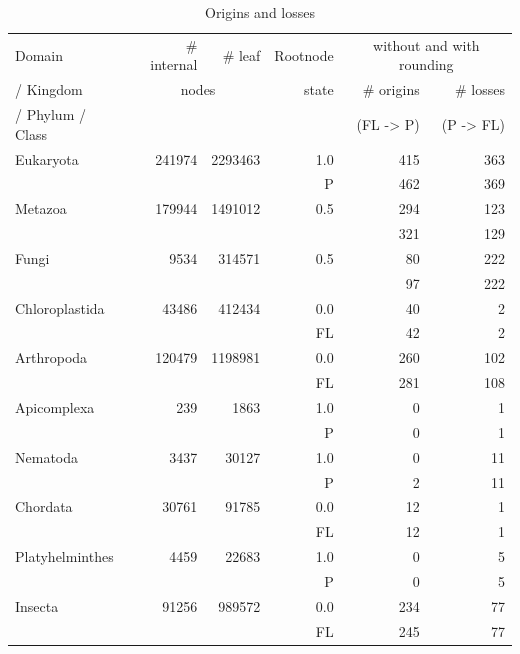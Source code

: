       \begin{table} [h]
        \begin{center}
          \begin{tabular}{ |l|r|r||r|r|r| }
            \hline
            Domain  & \# internal & \# leaf & Rootnode & \multicolumn{2}{c|}{without and with rounding} \\ 
            / Kingdom  & \multicolumn{2}{c||}{nodes} & state & \# origins & \# losses \\
            / Phylum / Class & & & & (FL -> P) & (P -> FL) \\
            \hline \hline
            Eukaryota & 241974 & 2293463 & 1.0 & 415 & 363 \\
            & & & P & 462 & 369 \\
            \hline \hline
            Metazoa & 179944 & 1491012 & 0.5 & 294 & 123 \\
            & & & & 321 & 129 \\ \hline
            Fungi & 9534 & 314571 & 0.5 & 80 & 222 \\
            & & & & 97 & 222 \\ \hline
            Chloroplastida & 43486 & 412434 & 0.0 & 40 & 2 \\
            & & & FL & 42 & 2 \\
            \hline \hline            
            Arthropoda & 120479 & 1198981 & 0.0 & 260 & 102 \\
            & & & FL & 281 & 108 \\ \hline
            Apicomplexa & 239 & 1863 & 1.0 & 0 & 1 \\
            & & & P & 0 & 1 \\ \hline
            Nematoda & 3437 & 30127 & 1.0 & 0 & 11 \\
            & & & P & 2 & 11 \\ \hline
            Chordata & 30761 & 91785 & 0.0 & 12 & 1 \\
            & & & FL & 12 & 1 \\ \hline
            Platyhelminthes & 4459 & 22683 & 1.0 & 0 & 5 \\
            & & & P & 0 & 5 \\
            \hline \hline            
            Insecta & 91256 & 989572 & 0.0 & 234 & 77 \\
            & & & FL & 245 & 77 \\ 
            \hline  
          \end{tabular}
        \end{center}
        \caption{Origins and losses}
        \label{table:origins and losses} 
      \end{table}

